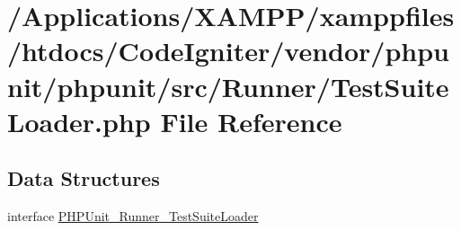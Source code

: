 \hypertarget{_test_suite_loader_8php}{}\section{/\+Applications/\+X\+A\+M\+P\+P/xamppfiles/htdocs/\+Code\+Igniter/vendor/phpunit/phpunit/src/\+Runner/\+Test\+Suite\+Loader.php File Reference}
\label{_test_suite_loader_8php}
\subsection*{Data Structures}
\begin{DoxyCompactItemize}
\item 
interface \mbox{\hyperlink{interface_p_h_p_unit___runner___test_suite_loader}{P\+H\+P\+Unit\+\_\+\+Runner\+\_\+\+Test\+Suite\+Loader}}
\end{DoxyCompactItemize}

